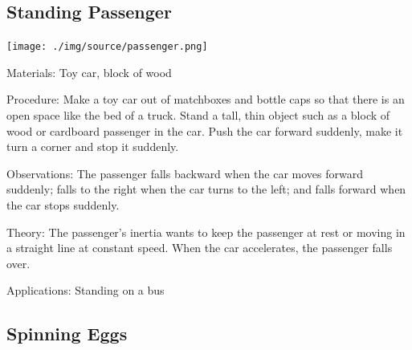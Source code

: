 \begin{multicols}{2}
\subsection{Standing Passenger}

\begin{center}
\texttt{[image: ./img/source/passenger.png]}
\end{center}

\begin{description*}
\item[Materials:]{Toy car, block of wood}
\item[Procedure:]{Make a toy car out of matchboxes and bottle caps so that there is an open space like the bed of a truck. Stand a tall, thin object such as a block of wood or cardboard passenger in the car. Push the car forward suddenly, make it turn a corner and stop it suddenly.}
\item[Observations:]{The passenger falls backward when the car moves forward suddenly; falls to the right when the car turns to the left; and falls forward when the car stops suddenly.}
\item[Theory:]{The passenger's inertia wants to keep the passenger at rest or moving in a straight line at constant speed. When the car accelerates, the passenger falls over.}
\item[Applications:]{Standing on a bus}
\end{description*}

\subsection{Spinning Eggs}



\end{multicols}

